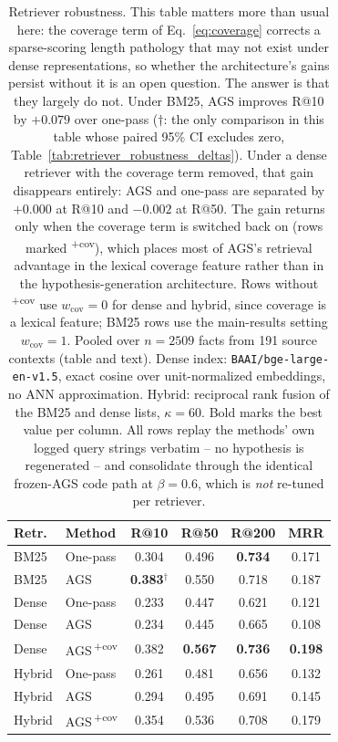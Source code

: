 \begin{table}[h]
\centering
\small
\begin{tabular}{@{}llcccc@{}}
\toprule
\textbf{Retr.} & \textbf{Method} & \textbf{R@10} & \textbf{R@50} & \textbf{R@200} & \textbf{MRR} \\
\midrule
BM25 & One-pass & 0.304 & 0.496 & \textbf{0.734} & 0.171 \\
BM25 & AGS & \textbf{0.383}$^{\dagger}$ & 0.550 & 0.718 & 0.187 \\
\midrule
Dense & One-pass & 0.233 & 0.447 & 0.621 & 0.121 \\
Dense & AGS & 0.234 & 0.445 & 0.665 & 0.108 \\
Dense & AGS\,\textsuperscript{+cov} & 0.382 & \textbf{0.567} & \textbf{0.736} & \textbf{0.198} \\
\midrule
Hybrid & One-pass & 0.261 & 0.481 & 0.656 & 0.132 \\
Hybrid & AGS & 0.294 & 0.495 & 0.691 & 0.145 \\
Hybrid & AGS\,\textsuperscript{+cov} & 0.354 & 0.536 & 0.708 & 0.179 \\
\bottomrule
\end{tabular}
\caption{Retriever robustness. This table matters more than usual here: the coverage term of
Eq.~\ref{eq:coverage} corrects a sparse-scoring length pathology that may not exist under dense
representations, so whether the architecture's gains persist without it is an open question.
The answer is that they largely do not. Under BM25, AGS improves R@10 by $+0.079$ over one-pass
($\dagger$: the only comparison in this table whose paired 95\% CI excludes zero,
Table~\ref{tab:retriever_robustness_deltas}). Under a dense retriever with the coverage term
removed, that gain disappears entirely: AGS and one-pass are separated by $+0.000$ at R@10 and
$-0.002$ at R@50. The gain returns only when the coverage term is switched back on
(rows marked \textsuperscript{+cov}), which places most of AGS's retrieval advantage in the
lexical coverage feature rather than in the hypothesis-generation architecture. Rows without
\textsuperscript{+cov} use $w_{\text{cov}}{=}0$ for dense and hybrid, since coverage is a lexical
feature; BM25 rows use the main-results setting $w_{\text{cov}}{=}1$. Pooled over
$n{=}2509$ facts from 191 source contexts (table and text). Dense index: \texttt{BAAI/bge-large-en-v1.5},
exact cosine over unit-normalized embeddings, no ANN approximation. Hybrid: reciprocal rank
fusion of the BM25 and dense lists, $\kappa{=}60$. Bold marks the best value per column.
All rows replay the methods' own logged query strings verbatim -- no hypothesis is regenerated --
and consolidate through the identical frozen-AGS code path at $\beta{=}0.6$, which is
\emph{not} re-tuned per retriever.}
\label{tab:retriever_robustness}
\end{table}

